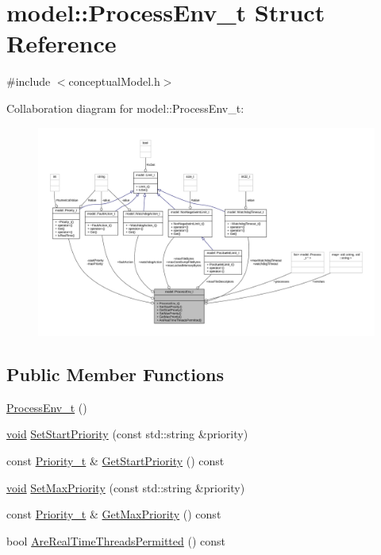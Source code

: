 \hypertarget{structmodel_1_1_process_env__t}{}\section{model\+:\+:Process\+Env\+\_\+t Struct Reference}
\label{structmodel_1_1_process_env__t}


{\ttfamily \#include $<$conceptual\+Model.\+h$>$}



Collaboration diagram for model\+:\+:Process\+Env\+\_\+t\+:
\nopagebreak
\begin{figure}[H]
\begin{center}
\leavevmode
\includegraphics[width=350pt]{structmodel_1_1_process_env__t__coll__graph}
\end{center}
\end{figure}
\subsection*{Public Member Functions}
\begin{DoxyCompactItemize}
\item 
\hyperlink{structmodel_1_1_process_env__t_a63030b2769539fb822846acebf274631}{Process\+Env\+\_\+t} ()
\item 
\hyperlink{_t_e_m_p_l_a_t_e__cdef_8h_ac9c84fa68bbad002983e35ce3663c686}{void} \hyperlink{structmodel_1_1_process_env__t_a74c5bd96874150114430a952fd0296e4}{Set\+Start\+Priority} (const std\+::string \&priority)
\item 
const \hyperlink{classmodel_1_1_priority__t}{Priority\+\_\+t} \& \hyperlink{structmodel_1_1_process_env__t_a391bbd4195b586e7ac950ba39c745f6d}{Get\+Start\+Priority} () const 
\item 
\hyperlink{_t_e_m_p_l_a_t_e__cdef_8h_ac9c84fa68bbad002983e35ce3663c686}{void} \hyperlink{structmodel_1_1_process_env__t_acd47de84d4682e99050f20aba1e33f83}{Set\+Max\+Priority} (const std\+::string \&priority)
\item 
const \hyperlink{classmodel_1_1_priority__t}{Priority\+\_\+t} \& \hyperlink{structmodel_1_1_process_env__t_a70431913791c3bd1e40d2db0b2bc66d4}{Get\+Max\+Priority} () const 
\item 
bool \hyperlink{structmodel_1_1_process_env__t_a1ffccd2ba6e7a223f5c9e02c5d590703}{Are\+Real\+Time\+Threads\+Permitted} () const 
\end{DoxyCompactItemize}
